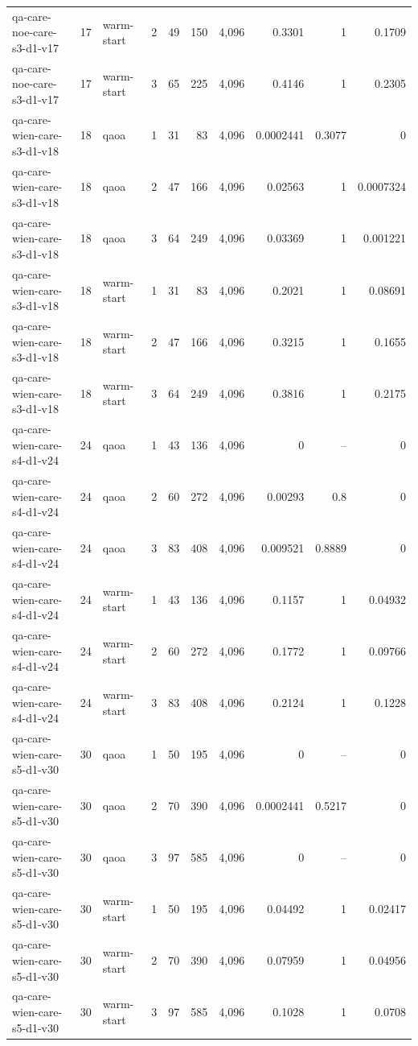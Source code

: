 \begin{table}[htbp]
{\begin{tabular}{lrlrrrrrrr}
qa-care-noe-care-s3-d1-v17 & 17 & warm-start & 2 & 49 & 150 & 4{,}096 & 0.3301 & 1 & 0.1709 \\
qa-care-noe-care-s3-d1-v17 & 17 & warm-start & 3 & 65 & 225 & 4{,}096 & 0.4146 & 1 & 0.2305 \\
qa-care-wien-care-s3-d1-v18 & 18 & qaoa & 1 & 31 & 83 & 4{,}096 & 0.0002441 & 0.3077 & 0 \\
qa-care-wien-care-s3-d1-v18 & 18 & qaoa & 2 & 47 & 166 & 4{,}096 & 0.02563 & 1 & 0.0007324 \\
qa-care-wien-care-s3-d1-v18 & 18 & qaoa & 3 & 64 & 249 & 4{,}096 & 0.03369 & 1 & 0.001221 \\
qa-care-wien-care-s3-d1-v18 & 18 & warm-start & 1 & 31 & 83 & 4{,}096 & 0.2021 & 1 & 0.08691 \\
qa-care-wien-care-s3-d1-v18 & 18 & warm-start & 2 & 47 & 166 & 4{,}096 & 0.3215 & 1 & 0.1655 \\
qa-care-wien-care-s3-d1-v18 & 18 & warm-start & 3 & 64 & 249 & 4{,}096 & 0.3816 & 1 & 0.2175 \\
qa-care-wien-care-s4-d1-v24 & 24 & qaoa & 1 & 43 & 136 & 4{,}096 & 0 & -- & 0 \\
qa-care-wien-care-s4-d1-v24 & 24 & qaoa & 2 & 60 & 272 & 4{,}096 & 0.00293 & 0.8 & 0 \\
qa-care-wien-care-s4-d1-v24 & 24 & qaoa & 3 & 83 & 408 & 4{,}096 & 0.009521 & 0.8889 & 0 \\
qa-care-wien-care-s4-d1-v24 & 24 & warm-start & 1 & 43 & 136 & 4{,}096 & 0.1157 & 1 & 0.04932 \\
qa-care-wien-care-s4-d1-v24 & 24 & warm-start & 2 & 60 & 272 & 4{,}096 & 0.1772 & 1 & 0.09766 \\
qa-care-wien-care-s4-d1-v24 & 24 & warm-start & 3 & 83 & 408 & 4{,}096 & 0.2124 & 1 & 0.1228 \\
qa-care-wien-care-s5-d1-v30 & 30 & qaoa & 1 & 50 & 195 & 4{,}096 & 0 & -- & 0 \\
qa-care-wien-care-s5-d1-v30 & 30 & qaoa & 2 & 70 & 390 & 4{,}096 & 0.0002441 & 0.5217 & 0 \\
qa-care-wien-care-s5-d1-v30 & 30 & qaoa & 3 & 97 & 585 & 4{,}096 & 0 & -- & 0 \\
qa-care-wien-care-s5-d1-v30 & 30 & warm-start & 1 & 50 & 195 & 4{,}096 & 0.04492 & 1 & 0.02417 \\
qa-care-wien-care-s5-d1-v30 & 30 & warm-start & 2 & 70 & 390 & 4{,}096 & 0.07959 & 1 & 0.04956 \\
qa-care-wien-care-s5-d1-v30 & 30 & warm-start & 3 & 97 & 585 & 4{,}096 & 0.1028 & 1 & 0.0708 \\

\end{tabular}}
\end{table}
